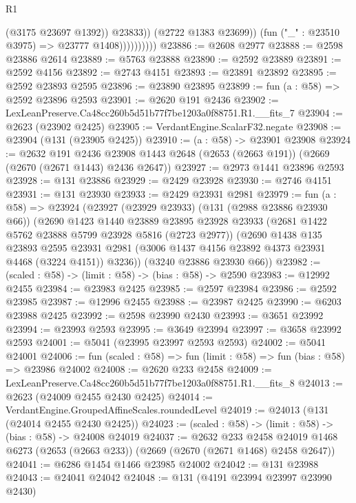 \begin{lexlean}{R1}
\begin{coremodule}
                              (@3175 @23697 @1392))
                            @23833))
                        (@2722 @1383 @23699))
                      (fun ("_" : @23510 @3975) => @23777 @1408))))))))))
@23886 := @2608 @2977
@23888 := @2598 @23886 @2614
@23889 := @5763 @23888
@23890 := @2592 @23889
@23891 := @2592 @4156
@23892 := @2743 @4151
@23893 := @23891 @23892
@23895 := @2592 @23893 @2595
@23896 := @23890 @23895
@23899 := fun (a : @58) => @2592 @23896 @2593
@23901 := @2620 @191 @2436
@23902 := LexLeanPreserve.Ca48cc260b5d51b77f7be1203a0f88751.R1.__fits_7
@23904 := @2623 (@23902 @2425)
@23905 := VerdantEngine.ScalarF32.negate
@23908 := @23904 (@131 (@23905 @2425))
@23910 := (a : @58) -> @23901 @23908
@23924 := @2632
    @191
    @2436
    @23908
    @1443
    @2648
    (@2653 (@2663 @191))
    (@2669 (@2670 (@2671 @1443) @2436 @2647))
@23927 := @2973 @1441 @23896 @2593
@23928 := @131 @23886
@23929 := @2429 @23928
@23930 := @2746 @4151
@23931 := @131 @23930
@23933 := @2429 @23931 @2981
@23979 := fun (a : @58) =>
  @23924
    (@23927
      (@23929 @23933)
      (@131 (@2988 @23886 @23930 @66))
      (@2690
        @1423
        @1440
        @23889
        @23895
        @23928
        @23933
        (@2681 @1422 @5762 @23888 @5799 @23928 @5816 (@2723 @2977))
        (@2690
          @1438
          @135
          @23893
          @2595
          @23931
          @2981
          (@3006 @1437 @4156 @23892 @4373 @23931 @4468 (@3224 @4151))
          @3236))
      (@3240 @23886 @23930 @66))
@23982 := (scaled : @58) -> (limit : @58) -> (bias : @58) -> @2590
@23983 := @12992 @2455
@23984 := @23983 @2425
@23985 := @2597 @23984
@23986 := @2592 @23985
@23987 := @12996 @2455
@23988 := @23987 @2425
@23990 := @6203 @23988 @2425
@23992 := @2598 @23990 @2430
@23993 := @3651 @23992
@23994 := @23993 @2593
@23995 := @3649 @23994
@23997 := @3658 @23992 @2593
@24001 := @5041 (@23995 @23997 @2593 @2593)
@24002 := @5041 @24001
@24006 := fun (scaled : @58) => fun (limit : @58) => fun (bias : @58) => @23986 @24002
@24008 := @2620 @233 @2458
@24009 := LexLeanPreserve.Ca48cc260b5d51b77f7be1203a0f88751.R1.__fits_8
@24013 := @2623 (@24009 @2455 @2430 @2425)
@24014 := VerdantEngine.GroupedAffineScales.roundedLevel
@24019 := @24013 (@131 (@24014 @2455 @2430 @2425))
@24023 := (scaled : @58) -> (limit : @58) -> (bias : @58) -> @24008 @24019
@24037 := @2632
    @233
    @2458
    @24019
    @1468
    @6273
    (@2653 (@2663 @233))
    (@2669 (@2670 (@2671 @1468) @2458 @2647))
@24041 := @6286 @1454 @1466 @23985 @24002
@24042 := @131 @23988
@24043 := @24041 @24042
@24048 := @131 (@4191 @23994 @23997 @23990 @2430)

\end{coremodule}
\end{lexlean}
